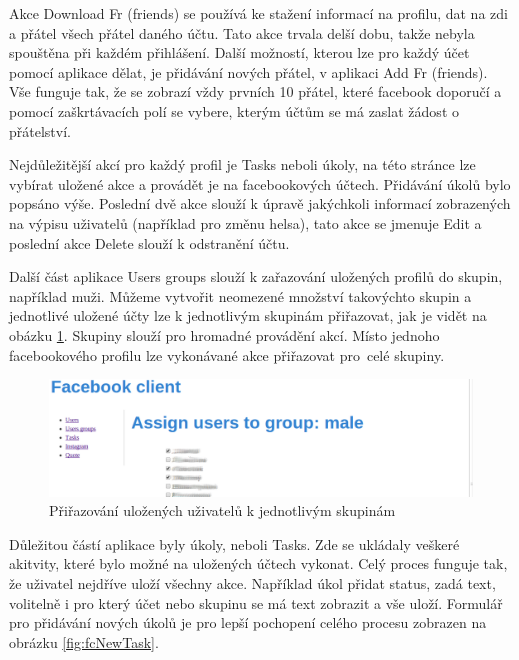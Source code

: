 \documentclass[thesis=M,czech]{FITthesis}[2013/05/10]
\begin{document}
Akce Download Fr (friends) se používá ke stažení informací na profilu, dat na zdi a přátel všech přátel daného účtu. Tato akce trvala delší dobu, takže nebyla spouštěna při každém přihlášení. Další možností, kterou lze pro každý účet pomocí aplikace dělat, je přidávání nových přátel, v aplikaci Add Fr (friends). Vše funguje tak, že se zobrazí vždy prvních 10 přátel, které facebook doporučí a pomocí zaškrtávacích polí se vybere, kterým účtům se má zaslat žádost o přátelství.

Nejdůležitější akcí pro každý profil je Tasks neboli úkoly, na této stránce lze vybírat uložené akce a provádět je na facebookových účtech. Přidávání úkolů bylo popsáno výše. Poslední dvě akce slouží k úpravě jakýchkoli informací  zobrazených na výpisu uživatelů (například pro změnu helsa), tato akce se jmenuje Edit a poslední akce Delete slouží k odstranění účtu.

Další část aplikace Users groups slouží k zařazování uložených profilů do skupin, například muži. Můžeme vytvořit neomezené množství takovýchto skupin a jednotlivé uložené účty lze k jednotlivým skupinám přiřazovat, jak je vidět na obázku \ref{fig:fcAssignGroup}. Skupiny slouží pro hromadné provádění akcí. Místo jednoho facebookového profilu lze vykonávané akce přiřazovat pro~celé skupiny.

\begin{figure}[h]
\begin{center}
\includegraphics[width=5in]{figures/fcAssignGroup.png}
\caption{Přiřazování uložených uživatelů k jednotlivým skupinám}
\label{fig:fcAssignGroup}
\end{center}
\end{figure}

Důležitou částí aplikace byly úkoly, neboli Tasks. Zde se ukládaly veškeré akitvity, které bylo možné na uložených účtech vykonat. Celý proces funguje tak, že uživatel nejdříve uloží všechny akce. Například úkol přidat status, zadá text, volitelně i pro který účet nebo skupinu se má text zobrazit a vše uloží. Formulář pro přidávání nových úkolů je pro lepší pochopení celého procesu zobrazen na obrázku \ref{fig:fcNewTask}.
\end{document}
